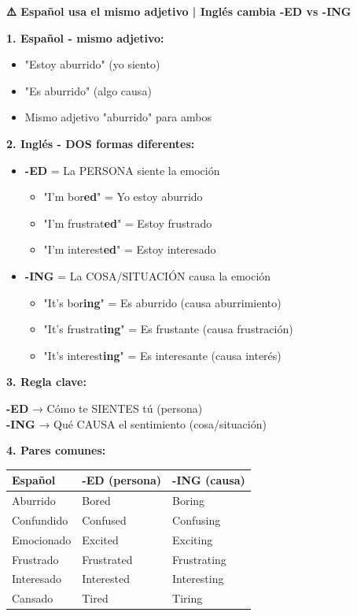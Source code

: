 \begin{comparisonbox}[title=🇪🇸 Adjetivos -ED/-ING: Español NO distingue - Inglés SÍ]
\textbf{⚠️ Español usa el mismo adjetivo | Inglés cambia -ED vs -ING}

\textbf{1. Español - mismo adjetivo:}
\begin{itemize}
    \item "Estoy aburrido" (yo siento)
    \item "Es aburrido" (algo causa)
    \item Mismo adjetivo "aburrido" para ambos
\end{itemize}

\textbf{2. Inglés - DOS formas diferentes:}
\begin{itemize}
    \item \textbf{-ED} = La PERSONA siente la emoción
    \begin{itemize}
        \item "I'm bor\textbf{ed}" = Yo estoy aburrido
        \item "I'm frustrat\textbf{ed}" = Estoy frustrado
        \item "I'm interest\textbf{ed}" = Estoy interesado
    \end{itemize}
    \item \textbf{-ING} = La COSA/SITUACIÓN causa la emoción
    \begin{itemize}
        \item "It's bor\textbf{ing}" = Es aburrido (causa aburrimiento)
        \item "It's frustrat\textbf{ing}" = Es frustante (causa frustración)
        \item "It's interest\textbf{ing}" = Es interesante (causa interés)
    \end{itemize}
\end{itemize}

\textbf{3. Regla clave:}
\begin{center}
\textbf{-ED} → Cómo te SIENTES tú (persona)\\
\textbf{-ING} → Qué CAUSA el sentimiento (cosa/situación)
\end{center}

\textbf{4. Pares comunes:}
\begin{center}
\begin{tabular}{|l|l|l|}
\hline
\textbf{Español} & \textbf{-ED (persona)} & \textbf{-ING (causa)} \\
\hline
Aburrido & Bored & Boring \\
Confundido & Confused & Confusing \\
Emocionado & Excited & Exciting \\
Frustrado & Frustrated & Frustrating \\
Interesado & Interested & Interesting \\
Cansado & Tired & Tiring \\
\hline
\end{tabular}
\end{center}


\end{comparisonbox}
